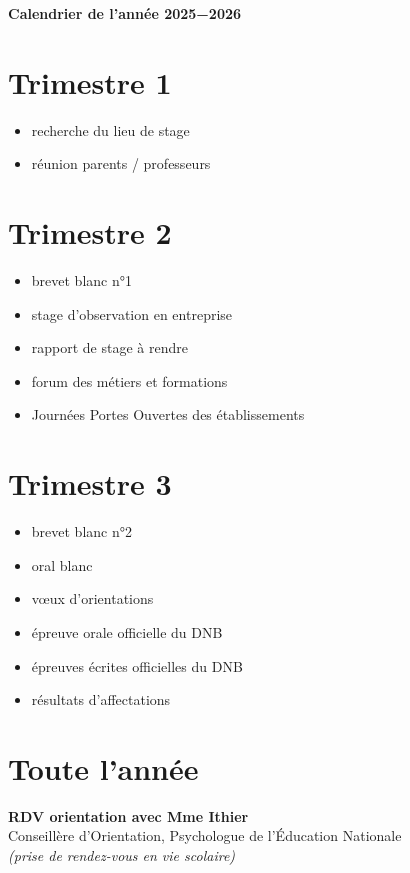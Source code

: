\documentclass[11pt]{article}
\newcommand{\ligne}{{\color{gray!60}\hrulefill}}
\begin{document}
\begin{tcolorbox}[colback=blue!10!white, colframe=blue!80!black]
\begin{center}
\Large\textbf{Calendrier de l’année 2025−2026}
\end{center}
\end{tcolorbox}


\section*{Trimestre 1}
\begin{itemize}
  \item recherche du lieu de stage \ligne
  \item réunion parents / professeurs \ligne
\end{itemize}

\section*{Trimestre 2}
\begin{itemize}
  \item brevet blanc n°1 \ligne
  \item stage d'observation en entreprise \ligne
  \item rapport de stage à rendre \ligne
  \item forum des métiers et formations \ligne
  \item Journées Portes Ouvertes des établissements \ligne
\end{itemize}

\section*{Trimestre 3}
\begin{itemize}[itemsep=0.2em]
  \item brevet blanc n°2 \ligne
  \item oral blanc \ligne
  \item vœux d'orientations \ligne
  \item épreuve orale officielle du DNB \ligne
  \item épreuves écrites officielles du DNB \ligne
  \item résultats d’affectations \ligne
\end{itemize}

\section*{Toute l’année}
\textbf{RDV orientation avec Mme Ithier} \ligne \\
Conseillère d'Orientation, Psychologue de l'Éducation Nationale\\
\emph{(prise de rendez-vous en vie scolaire)}
\end{document}
